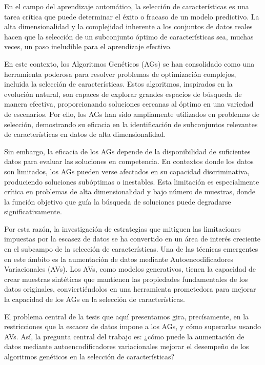 
En el campo del aprendizaje automático, la selección de características es una tarea crítica que puede determinar el éxito o fracaso de un modelo predictivo. La alta dimensionalidad y la complejidad inherente a los conjuntos de datos reales hacen que la selección de un subconjunto óptimo de características sea, muchas veces, un paso ineludible para el aprendizaje efectivo.

En este contexto, los Algoritmos Genéticos (AGs) se han consolidado como una herramienta poderosa para resolver problemas de optimización complejos, incluida la selección de características. Estos algoritmos, inspirados en la evolución natural, son capaces de explorar grandes espacios de búsqueda de manera efectiva, proporcionando soluciones cercanas al óptimo en una variedad de escenarios. Por ello, los AGs han sido ampliamente utilizados en problemas de selección, demostrando su eficacia en la identificación de subconjuntos relevantes de características en datos de alta dimensionalidad.

Sin embargo, la eficacia de los AGs depende de la disponibilidad de suficientes datos para evaluar las soluciones en competencia. En contextos donde los datos son limitados, los AGs pueden verse afectados en su capacidad discriminativa, produciendo soluciones subóptimas o inestables. Esta limitación es especialmente crítica en problemas de alta dimensionalidad y bajo número de muestras, donde la función objetivo que guía la búsqueda de soluciones puede degradarse significativamente.

Por esta razón, la investigación de estrategias que mitiguen las limitaciones impuestas por la escasez de datos se ha convertido en un área de interés creciente en el subcampo de la selección de características. Una de las técnicas emergentes en este ámbito es la aumentación de datos mediante Autoencodificadores Variacionales (AVs). Los AVs, como modelos generativos, tienen la capacidad de crear muestras sintéticas que mantienen las propiedades fundamentales de los datos originales, conviertiéndolos en una herramienta prometedora para mejorar la capacidad de los AGs en la selección de características.

El problema central de la tesis que aquí presentamos gira, precísamente, en la restricciones que la escacez de datos impone a los AGs, y cómo superarlas usando AVs. Así, la pregunta central del trabajo es: ¿cómo puede la aumentación de datos mediante autoencodificadores variacionales mejorar el desempeño de los algoritmos genéticos en la selección de características?

